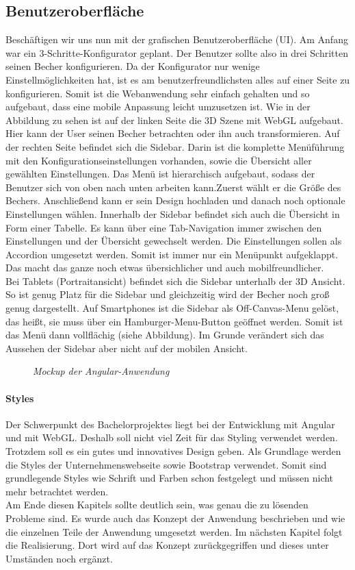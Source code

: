 \subsection{Benutzeroberfläche}
Beschäftigen wir uns nun mit der grafischen Benutzeroberfläche (UI). Am Anfang war ein 3-Schritte-Konfigurator geplant. Der Benutzer sollte also in drei Schritten seinen Becher konfigurieren. Da der Konfigurator nur wenige Einstellmöglichkeiten hat, ist es am benutzerfreundlichsten alles auf einer Seite zu konfigurieren. Somit ist die Webanwendung sehr einfach gehalten und so aufgebaut, dass eine mobile Anpassung leicht umzusetzen ist. Wie in der Abbildung zu sehen ist auf der linken Seite die 3D Szene mit WebGL aufgebaut. Hier kann der User seinen Becher betrachten oder ihn auch transformieren. Auf der rechten Seite befindet sich die Sidebar. Darin ist die komplette Menüführung mit den Konfigurationseinstellungen vorhanden, sowie die Übersicht aller gewählten Einstellungen. Das Menü ist hierarchisch aufgebaut, sodass der Benutzer sich von oben nach unten arbeiten kann.Zuerst wählt er die Größe des Bechers. Anschließend kann er sein Design hochladen und danach noch optionale Einstellungen wählen. Innerhalb der Sidebar befindet sich auch die Übersicht in Form einer Tabelle. Es kann über eine Tab-Navigation immer zwischen den Einstellungen und der Übersicht gewechselt werden. Die Einstellungen sollen als Accordion umgesetzt werden. Somit ist immer nur ein Menüpunkt aufgeklappt. Das macht das ganze noch etwas übersichlicher und auch mobilfreundlicher. \\
Bei Tablets (Portraitansicht) befindet sich die Sidebar unterhalb der 3D Ansicht. So ist genug Platz für die Sidebar und gleichzeitig wird der Becher noch groß genug dargestellt. Auf Smartphones ist die Sidebar als Off-Canvas-Menu gelöst, das heißt, sie muss über ein Hamburger-Menu-Button geöffnet werden. Somit ist das Menü dann vollflächig (siehe Abbildung). Im Grunde verändert sich das Aussehen der Sidebar aber nicht auf der mobilen Ansicht.
\begin{figure}[h]
	\centering
	{}
	\caption[Mockup]{\textit{Mockup der Angular-Anwendung}}
	\label{fig:mockup}
\end{figure}

\paragraph{Styles}Der Schwerpunkt des Bachelorprojektes liegt bei der Entwicklung mit Angular und mit WebGL. Deshalb soll nicht viel Zeit für das Styling verwendet werden. Trotzdem soll es ein gutes und innovatives Design geben. Als Grundlage werden die Styles der Unternehmenswebseite sowie Bootstrap verwendet. Somit sind grundlegende Styles wie Schrift und Farben schon festgelegt und müssen nicht mehr betrachtet werden.\\


Am Ende diesen Kapitels sollte deutlich sein, was genau die zu lösenden Probleme sind. Es wurde auch das Konzept der Anwendung beschrieben und wie die einzelnen Teile der Anwendung umgesetzt werden. Im nächsten Kapitel folgt die Realisierung. Dort wird auf das Konzept zurückgegriffen und dieses unter Umständen noch ergänzt.
%